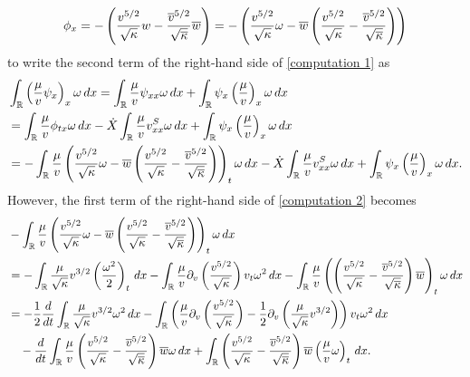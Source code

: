 \documentclass[11pt,reqno]{amsart}
\begin{document}
\begin{appendix}
\begin{equation*}
\phi_x =-\left(\frac{v^{5/2}}{\sqrt{\kappa}} w - \frac{\overline{v}^{5/2}}{\sqrt{\overline{\kappa}}} \overline{w} \right)=-\left(\frac{v^{5/2}}{\sqrt{\kappa}} \omega - \overline{w} \left(\frac{v^{5/2}}{\sqrt{\kappa}}-\frac{\overline{v}^{5/2}}{\sqrt{\overline{\kappa}}}  \right) \right)
\end{equation*}
to write the second term of the right-hand side of  \eqref{computation 1} as 
\begin{equation} \label{computation 2}
\begin{aligned}
&\int_\mathbb{R} \left( \frac{\mu}{v} \psi_x\right)_x \omega \, dx =\int_\mathbb{R} \frac{\mu}{v} \psi_{xx} \omega \, dx+\int_\mathbb{R} \psi_x \left( \frac{\mu}{v} \right)_x \omega \, dx \\
&=\int_\mathbb{R} \frac{\mu}{v} \phi_{tx} \omega \, dx - \dot{X} \int_\mathbb{R} \frac{\mu}{v} v^S_{xx} \omega \, dx +\int_\mathbb{R} \psi_x \left( \frac{\mu}{v} \right)_x \omega \, dx \\ 
&=-\int_\mathbb{R} \frac{\mu}{v} \left(\frac{v^{5/2}}{\sqrt{\kappa}} \omega -\overline{w} \left(\frac{v^{5/2}}{\sqrt{\kappa}}-\frac{\overline{v}^{5/2}}{\sqrt{\overline{\kappa}}} \right) \right)_t \omega \, dx - \dot{X} \int_\mathbb{R} \frac{\mu}{v} v^S_{xx} \omega \, dx +\int_\mathbb{R} \psi_x \left( \frac{\mu}{v} \right)_x \omega \, dx.
\end{aligned}
\end{equation}
However, the first term of the right-hand side of \eqref{computation 2} becomes
\begin{equation} \label{computation 3}
\begin{aligned}
&-\int_\mathbb{R} \frac{\mu}{v} \left(\frac{v^{5/2}}{\sqrt{\kappa}} \omega -\ow \left(\frac{v^{5/2}}{\sqrt{\kappa}}-\frac{\ov^{5/2}}{\sqrt{\ok}} \right) \right)_t \omega \, dx \\
&=- \int_\mathbb{R} \frac{\mu }{\sqrt{\kappa}}v^{3/2} \left(\frac{\omega^2}{2}\right)_t \, dx - \int_\mathbb{R}   \frac{\mu}{v} \partial_v \left( \frac{v^{5/2}}{\sqrt{\kappa}} \right) v_t \omega^2 \, dx  -\int_\mathbb{R}\frac{\mu}{v} \left( \left(\frac{v^{5/2}}{\sqrt{\kappa}}-\frac{\ov^{5/2}}{\sqrt{\ok}}\right) \ow \right)_t \omega \, dx   \\
&=-\frac{1}{2} \frac{d}{dt} \int_\mathbb{R} \frac{\mu }{\sqrt{\kappa}}v^{3/2} \omega^2 \, dx - \int_\mathbb{R}    \left( \frac{\mu}{v} \partial_v \left( \frac{v^{5/2}}{\sqrt{\kappa}} \right)-\frac{1}{2}  \partial_v \left( \frac{\mu }{\sqrt{\kappa}}v^{3/2} \right) \right) v_t \omega^2 \, dx \\
&\quad -\frac{d}{dt}\int_\mathbb{R} \frac{\mu}{v}  \left(\frac{v^{5/2}}{\sqrt{\kappa}}-\frac{\ov^{5/2}}{\sqrt{\ok}}\right) \ow  \omega \, dx+\int_\mathbb{R} \left(\frac{v^{5/2}}{\sqrt{\kappa}}-\frac{\ov^{5/2}}{\sqrt{\ok}}\right) \ow  \left(  \frac{\mu}{v} \omega \right)_t \, dx .

\end{aligned}
\end{equation}
\end{appendix}
\end{document}
